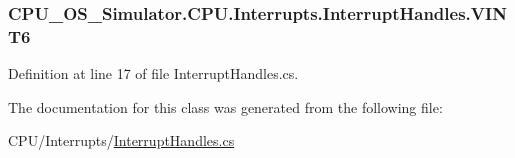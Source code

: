 \subsubsection[{V\+I\+N\+T6}]{ C\+P\+U\+\_\+\+O\+S\+\_\+\+Simulator.\+C\+P\+U.\+Interrupts.\+Interrupt\+Handles.\+V\+I\+N\+T6}\label{class_c_p_u___o_s___simulator_1_1_c_p_u_1_1_interrupts_1_1_interrupt_handles_a57cd1c044e9a34c629f14b991a58c226}


Definition at line 17 of file Interrupt\+Handles.\+cs.



The documentation for this class was generated from the following file\+:\begin{DoxyCompactItemize}
\item 
C\+P\+U/\+Interrupts/\hyperlink{_interrupt_handles_8cs}{Interrupt\+Handles.\+cs}\end{DoxyCompactItemize}
